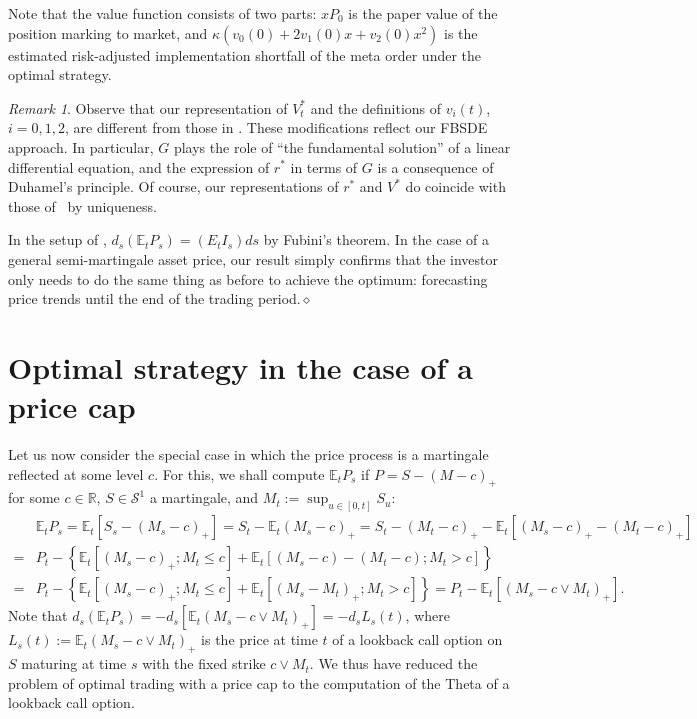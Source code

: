 \documentclass[openany,oneside]{article}
\theoremstyle{definition}
\theoremstyle{remark}
\newtheorem{rem}[thm]{Remark}
\newcommand{\E}{\mathbb{E}} %
\newcommand{\close}{\hspace*{\fill}$\diamond$}
\begin{document}
Note that the value function consists of two parts: $xP_0$ is the paper value of the position marking to market, and $\kappa(v_0(0)+2v_1(0)x+v_2(0)x^2)$ is the estimated risk-adjusted implementation shortfall of the meta order under the optimal strategy.

\begin{rem}
Observe that our representation of $V^\ast_t$ and the definitions of $v_i(t)$, $i=0,1,2$, are different from those in \cite{lehalle2017incorporating}. These modifications reflect our FBSDE approach. In particular, $G$ plays the role of ``the fundamental solution'' of a linear differential equation, and the expression of $r^\ast$ in terms of $G$ is a consequence of Duhamel's principle. Of course, our representations of $r^\ast$ and $V^\ast$ do coincide with those of~\cite{lehalle2017incorporating} by uniqueness.

In the setup of \cite{lehalle2017incorporating}, $d_s(\E_t P_s) = (E_t I_s)ds$ by Fubini's theorem. In the case of a general semi-martingale asset price, our result simply confirms that the investor only needs to do the same thing as before to achieve the optimum: forecasting price trends until the end of the trading period.\close
\end{rem}



\section{Optimal strategy in the case of a price cap}
Let us now consider the special case in which the price process is a martingale reflected at some level $c$. For this, we shall compute $\E_t P_s$ if $P=S-(M-c)_+$ for some $c\in\mathbb{R}$, $S\in\mathcal{S}^1$ a martingale, and $M_t:=\sup_{u\in[0,t]}S_u$:
\begin{align*}
& \E_t P_s = \E_t[S_s-(M_s-c)_+] = S_t-\E_t(M_s-c)_+ = S_t-(M_t-c)_+ - \E_t\left[(M_s-c)_+ - (M_t-c)_+\right] \\
=& P_t -\left\{ \E_t\left[(M_s-c)_+; M_t\le c\right] + \E_t\left[(M_s-c)-(M_t-c); M_t > c\right] \right\} \\
=& P_t -\left\{ \E_t\left[(M_s-c)_+; M_t\le c\right] + \E_t\left[(M_s-M_t)_+; M_t > c\right] \right\} = P_t - \E_t\left[(M_s-c\vee M_t)_+\right].
\end{align*}
Note that $d_s(\E_t P_s) = -d_s\left[\E_t(M_s-c\vee M_t)_+\right] = -d_s L_s(t)$, where $L_s(t):=\E_t(M_s-c\vee M_t)_+$ is the price at time $t$ of a lookback call option on $S$ maturing at time $s$ with the fixed strike $c\vee M_t$. We thus have reduced the problem of optimal trading with a price cap to the computation of the Theta of a lookback call option.
\end{document}
